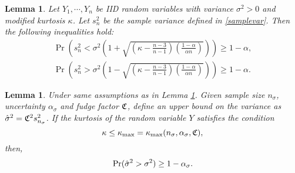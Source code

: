 \documentclass{iitthesis}
\newtheorem{lemma}[theorem]{Lemma}
\theoremstyle{definition}
\begin{document}
\begin{lemma}\cite[Lemma 1]{HJLO12} \label{samplevarbound}
Let $Y_1,\cdots,Y_n$ be IID random variables with variance $\sigma^2>0$ and modified kurtosis $\kappa$. Let $s_n^2$ be the sample variance defined in \eqref{samplevar}. Then the following inequalities hold: 
\begin{subequations}
\begin{gather}
\Pr\left( s_n^2 < \sigma^2 \left (1+\sqrt{\left (\kappa-\frac{n-3}{n-1}\right)\left (\frac{1-\alpha}{\alpha n}\right )}\right)\right) \geq 1-\alpha,\label{boundsamplevar1}\\ 
\Pr\left( s_n^2 >\sigma^2 \left (1-\sqrt{\left (\kappa-\frac{n-3}{n-1}\right)\left (\frac{1-\alpha}{\alpha n}\right )}\right)\right) \geq 1-\alpha.\label{boundsamplevar2}
\end{gather}
\end{subequations}

\end{lemma}
\begin{lemma}\label{lowerboundhsigma}
Under same assumptions as in Lemma \ref{samplevarbound}. Given sample size $n_\sigma$, uncertainty $\alpha_\sigma$ and fudge factor $\mathfrak{C}$, define an upper bound on the variance as $\hat{\sigma}^2 = \mathfrak{C}^2 s_{n_{\sigma}}^2$. If the kurtosis of the random variable $Y$ satisfies the condition $$\kappa \leq \kappa_{\max} =\kappa_{\max} (n_\sigma,\alpha_\sigma, \mathfrak{C}),$$ then, $$\Pr (\hat{\sigma}^2 > \sigma^2)\geq 1-\alpha_{\sigma}.$$
\end{lemma}
\end{document}
